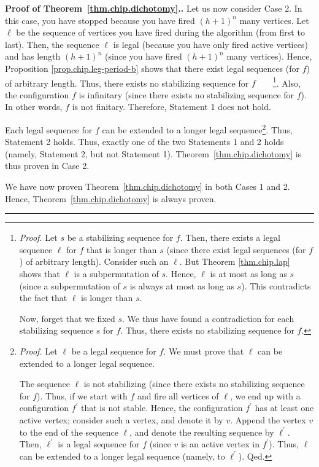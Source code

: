 \documentclass[numbers=enddot,12pt,final,onecolumn,notitlepage]{scrartcl}%
\theoremstyle{definition}
\newenvironment{proof}[1][Proof]{\noindent\textbf{#1.} }{\ \rule{0.5em}{0.5em}}
\begin{document}
\begin{proof}[Proof of Theorem~\ref{thm.chip.dichotomy}.]
Let us now consider Case 2. In this case, you have stopped because you have
fired $\left(  h+1\right)  ^{n}$ many vertices. Let $\ell$ be the sequence of
vertices you have fired during the algorithm (from first to last). Then, the
sequence $\ell$ is legal (because you have only fired active vertices) and has
length $\left(  h+1\right)  ^{n}$ (since you have fired $\left(  h+1\right)
^{n}$ many vertices). Hence, Proposition \ref{prop.chip.leg-period-b} shows
that there exist legal sequences (for $f$) of arbitrary length. Thus, there
exists no stabilizing sequence for $f$\ \ \ \ \footnote{\textit{Proof.} Let
$s$ be a stabilizing sequence for $f$. Then, there exists a legal sequence
$\ell$ for $f$ that is longer than $s$ (since there exist legal sequences (for
$f$) of arbitrary length). Consider such an $\ell$. But Theorem
\ref{thm.chip.lap} shows that $\ell$ is a subpermutation of $s$. Hence, $\ell$
is at most as long as $s$ (since a subpermutation of $s$ is always at most as
long as $s$). This contradicts the fact that $\ell$ is longer than $s$.
\par
Now, forget that we fixed $s$. We thus have found a contradiction for each
stabilizing sequence $s$ for $f$. Thus, there exists no stabilizing sequence
for $f$.}. Also, the configuration $f$ is infinitary (since there exists no
stabilizing sequence for $f$). In other words, $f$ is not finitary. Therefore,
Statement 1 does not hold.

Each legal sequence for $f$ can be extended to a longer legal
sequence\footnote{\textit{Proof.} Let $\ell$ be a legal sequence for $f$. We
must prove that $\ell$ can be extended to a longer legal sequence.
\par
The sequence $\ell$ is not stabilizing (since there exists no stabilizing
sequence for $f$). Thus, if we start with $f$ and fire all vertices of $\ell$,
we end up with a configuration $f^{\prime}$ that is not stable. Hence, the
configuration $f^{\prime}$ has at least one active vertex; consider such a
vertex, and denote it by $v$. Append the vertex $v$ to the end of the sequence
$\ell$, and denote the resulting sequence by $\ell^{\prime}$. Then,
$\ell^{\prime}$ is a legal sequence for $f$ (since $v$ is an active vertex in
$f^{\prime}$). Thus, $\ell$ can be extended to a longer legal sequence
(namely, to $\ell^{\prime}$). Qed.}. Thus, Statement 2 holds. Thus, exactly
one of the two Statements 1 and 2 holds (namely, Statement 2, but not
Statement 1). Theorem~\ref{thm.chip.dichotomy} is thus proven in Case 2.

We have now proven Theorem~\ref{thm.chip.dichotomy} in both Cases 1 and 2.
Hence, Theorem~\ref{thm.chip.dichotomy} is always proven.
\end{proof}
\end{document}
